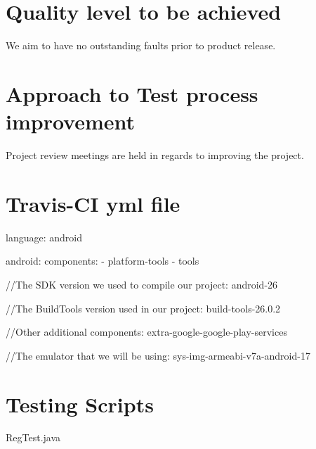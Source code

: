 \documentclass[english]{article}
\begin{document}
	\section{Quality level to be achieved}
	We aim to have no outstanding faults prior to product release.
	
	\section{Approach to Test process improvement}
	
	Project review meetings are held in regards to improving the project.
	
	 
	
	\section{Travis-CI yml file}
	language: android
	
	android:
	components:
	- platform-tools
	- tools
	
	
	//The SDK version we used to compile our project:
	 android-26
	
	//The BuildTools version used in our project: 
	 build-tools-26.0.2
	
	//Other additional components:  extra-google-google-play-services
	
	//The emulator that we will be using:
	 sys-img-armeabi-v7a-android-17	
	 
	\section{Testing Scripts}
	
	RegTest.java
		
\end{document}
